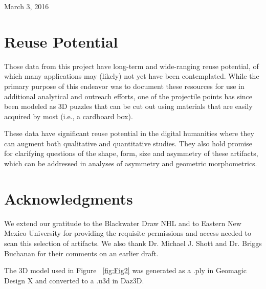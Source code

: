 \documentclass[preprint,12pt]{elsarticle}
\begin{document}
March 3, 2016

\section{Reuse Potential}

Those data from this project have long-term and wide-ranging reuse potential, of which many applications may (likely) not yet have been contemplated. While the primary purpose of this endeavor was to document these resources for use in additional analytical and outreach efforts, one of the projectile points has since been modeled as 3D puzzles that can be cut out using materials that are easily acquired by most (i.e., a cardboard box). 

These data have significant reuse potential in the digital humanities where they can augment both qualitative and quantitative studies. They also hold promise for clarifying questions of the shape, form, size and asymmetry of these artifacts, which can be addressed in analyses of asymmetry and geometric morphometrics. 

\section*{Acknowledgments}

We extend our gratitude to the Blackwater Draw NHL and to Eastern New Mexico University for providing the requisite permissions and access needed to scan this selection of artifacts. We also thank Dr. Michael J. Shott and Dr. Briggs Buchanan for their comments on an earlier draft.

The 3D model used in Figure ~\ref{fig:Fig2} was generated as a .ply in Geomagic Design X and converted to a .u3d in Daz3D.













\end{document}
